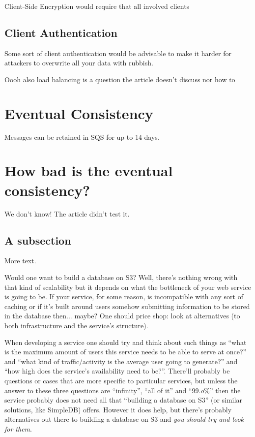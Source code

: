 \documentclass[11pt]{article}
\begin{document}
Client-Side Encryption would require that all involved clients 

\subsection{Client Authentication}
Some sort of client authentication would be advisable to make it harder for attackers to overwrite all your data with rubbish.



Oooh also load balancing is a question the article doesn't discuss nor how to 

\section{Eventual Consistency}
Messages can be retained in SQS for up to 14 days.

\section{How bad is the eventual consistency?}
We don't know! The article didn't test it.

\subsection{A subsection}

More text.

Would one want to build a database on S3?
Well, there's nothing wrong with that kind of scalability but it depends on what the bottleneck of your web service is going to be.
If your service, for some reason, is incompatible with any sort of caching or if it's built around users somehow submitting information to be stored in the database then... maybe?
One should price shop: look at alternatives (to both infrastructure and the service's structure).

When developing a service one should try and think about such things as ``what is the maximum amount of users this service needs to be able to serve at once?'' and ``what kind of traffic/activity is the average user going to generate?'' and ``how high does the service's availability need to be?''.
There'll probably be questions or cases that are more specific to particular services, but unless the answer to these three questions are ``infinity'', ``all of it'' and ``$99.\bar{o}\%$'' then the service probably does not need all that ``building a database on S3'' (or similar solutions, like SimpleDB) offers.
However it does help, but there's probably alternatives out there to building a database on S3 and \textit{you should try and look for them}.
\end{document}
